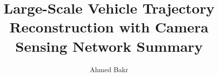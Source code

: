 \documentclass[conference]{IEEEtran}
\title{Large-Scale Vehicle Trajectory Reconstruction with Camera Sensing Network Summary}
\author[1]{Ahmed Bakr}
\affil[1]{Department of Computer Science, University of Alabama, AL, USA}
\begin{document}
\maketitle




\acresetall %




 






% 
\end{document}

